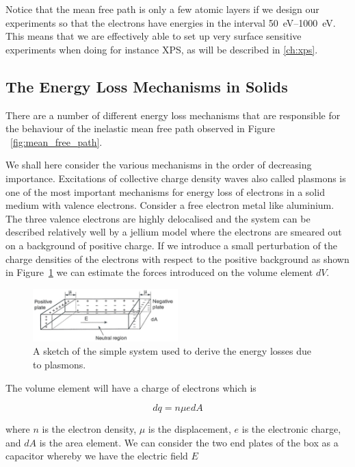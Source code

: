 Notice that the mean free path is only a few atomic layers if we design our experiments so that the electrons have energies in the interval \SIrange{50}{1000}{\electronvolt}. This means that we are effectively able to set up very surface sensitive experiments when doing for instance XPS, as will be described in \autoref{ch:xps}.

\subsection{The Energy Loss Mechanisms in Solids}
There are a number of different energy loss mechanisms that are responsible for the behaviour of the inelastic mean free path observed in Figure ~\ref{fig:mean_free_path}.

We shall here consider the various mechanisms in the order of decreasing importance. Excitations of collective charge density waves also called plasmons is one of the most important mechanisms for energy loss of electrons in a solid medium with valence electrons. Consider a free electron metal like aluminium. The three valence electrons are highly delocalised and the system can be described relatively well by a jellium model where the electrons are smeared out on a background of positive charge. If we introduce a small perturbation of the charge densities of the electrons with respect to the positive background as shown in Figure~\ref{fig:plasmon_derive} we can estimate the forces introduced on the volume element $dV$.

\begin{figure}[htbp]
\centering
\includegraphics[width=0.5\textwidth]{figures/02_07}
\caption{A sketch of the simple system used to derive the energy losses due to plasmons.}
\label{fig:plasmon_derive}
\end{figure}
 
The volume element will have a charge of electrons which is

\begin{equation}
dq = n\mu edA
\end{equation}

where $n$ is the electron density, $\mu$ is the displacement, $e$ is the electronic charge, and $dA$ is the area element. We can consider the two end plates of the box as a capacitor whereby we have the electric field $E$

